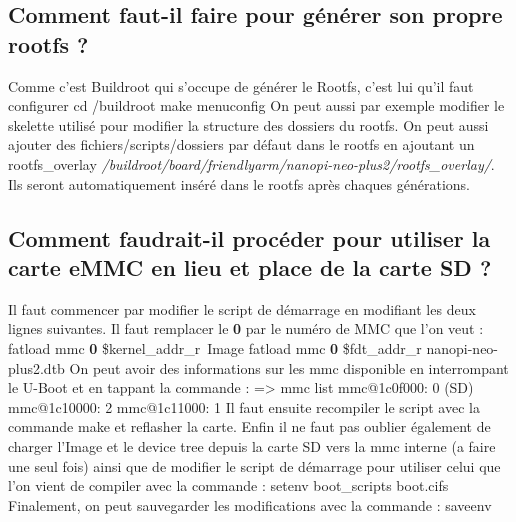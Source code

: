 \documentclass{ReportTemplate}
\begin{document}
\subsection{Comment faut-il faire pour générer son propre rootfs ?}
Comme c'est Buildroot qui s'occupe de générer le Rootfs, c'est lui qu'il faut configurer \newline
cd /buildroot \newline
make menuconfig \newline
On peut aussi par exemple modifier le skelette utilisé pour modifier la structure des dossiers du rootfs.
On peut aussi ajouter des fichiers/scripts/dossiers par défaut dans le rootfs en ajoutant un rootfs\_overlay \textit{/buildroot/board/friendlyarm/nanopi-neo-plus2/rootfs\_overlay/}. 
Ils seront automatiquement inséré dans le rootfs après chaques générations.

\subsection{Comment faudrait-il procéder pour utiliser la carte eMMC en lieu et place de la carte SD ?}
Il faut commencer par modifier le script de démarrage en modifiant les deux lignes suivantes. Il faut remplacer le \textbf{0} par le numéro de MMC que l'on veut : \newline
 fatload mmc \textbf{0} \$kernel\_addr\_r\ Image \newline
 fatload mmc \textbf{0} \$fdt\_addr\_r nanopi-neo-plus2.dtb \newline
On peut avoir des informations sur les mmc disponible en interrompant le U-Boot et en tappant la commande : \newline
 => mmc list\newline
 mmc@1c0f000: 0 (SD) \newline
 mmc@1c10000: 2 \newline
 mmc@1c11000: 1 \newline
Il faut ensuite recompiler le script avec la commande make et reflasher la carte. Enfin il ne faut pas oublier également de charger l'Image et le device tree depuis la carte SD vers la mmc interne (a faire une seul fois) ainsi que de modifier le script de démarrage pour utiliser celui que l'on vient de compiler avec la commande : \newline
 setenv boot\_scripts boot.cifs \newline
Finalement, on peut sauvegarder les modifications avec la commande :\newline
 saveenv
\end{document}
